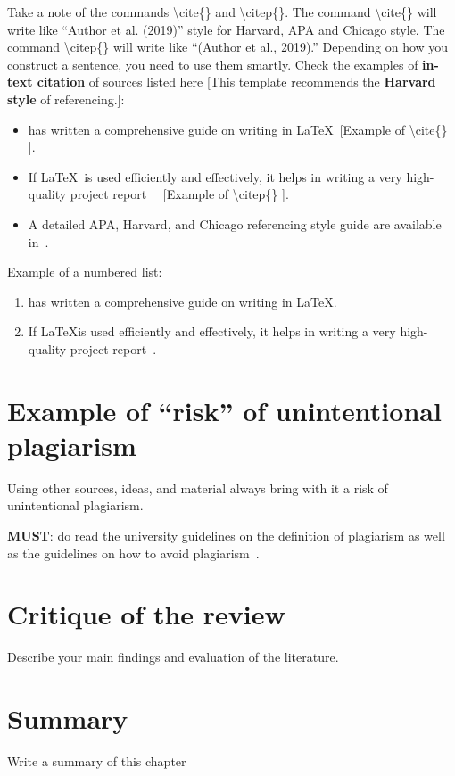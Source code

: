 Take a note of the commands \textbackslash cite\{\} and \textbackslash citep\{\}. The command \textbackslash cite\{\} will write like ``Author et al. (2019)'' style for Harvard, APA and Chicago style. The command \textbackslash citep\{\} will write like ``(Author et al., 2019).'' Depending on how you construct a sentence, you need to use them smartly. Check the examples of \textbf{in-text citation} of sources listed here [This template recommends the \textbf{Harvard style} of referencing.]:
\begin{itemize}
    \item \cite{lamport1994latex} has written a comprehensive guide on writing in \LaTeX ~[Example of \textbackslash cite\{\} ].
    \item If \LaTeX~is used efficiently and effectively, it helps in writing a very high-quality project report~\citep{lamport1994latex} ~[Example of \textbackslash citep\{\} ].   
    \item A detailed APA, Harvard, and Chicago referencing style guide are available in~\citep{uor_refernce_style}.
\end{itemize}

\noindent 
Example of a numbered list:
\begin{enumerate}
    \item \cite{lamport1994latex} has written a comprehensive guide on writing in \LaTeX.
    \item If \LaTeX is used efficiently and effectively, it helps in writing a very high-quality project report~\citep{lamport1994latex}.   
\end{enumerate}

\section{Example of ``risk'' of unintentional plagiarism}
Using other sources, ideas, and material always bring with it a risk of unintentional plagiarism. 

\noindent
\textbf{\color{red}MUST}: do read the university guidelines on the definition of plagiarism as well as the guidelines on how to avoid plagiarism~\citep{uor_plagiarism}.




\section{Critique of the review} %
Describe your main findings and evaluation of the literature. ~\\

\section{Summary} 
Write a summary of this chapter~\\
